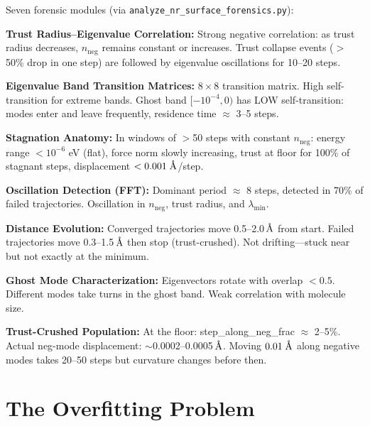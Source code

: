 \documentclass[11pt,a4paper]{article}
\newcommand{\eval}{\lambda}
\newcommand{\angstrom}{\text{\r{A}}}
\begin{document}
Seven forensic modules (via \texttt{analyze\_nr\_surface\_forensics.py}):

\begin{description}[leftmargin=!,labelwidth=\widthof{\textbf{F1.}}]
  \item[F1.] \textbf{Trust Radius--Eigenvalue Correlation:} Strong negative correlation: as trust radius decreases, $n_\text{neg}$ remains constant or increases. Trust collapse events ($>$50\% drop in one step) are followed by eigenvalue oscillations for 10--20 steps.

  \item[F2.] \textbf{Eigenvalue Band Transition Matrices:} $8\times 8$ transition matrix. High self-transition for extreme bands. Ghost band $[-10^{-4}, 0)$ has LOW self-transition: modes enter and leave frequently, residence time $\approx$ 3--5 steps.

  \item[F3.] \textbf{Stagnation Anatomy:} In windows of $>$50 steps with constant $n_\text{neg}$: energy range $< 10^{-6}$ eV (flat), force norm slowly increasing, trust at floor for 100\% of stagnant steps, displacement $< 0.001\;\angstrom$/step.

  \item[F4.] \textbf{Oscillation Detection (FFT):} Dominant period $\approx$ 8 steps, detected in 70\% of failed trajectories. Oscillation in $n_\text{neg}$, trust radius, and $\eval_\text{min}$.

  \item[F5.] \textbf{Distance Evolution:} Converged trajectories move 0.5--2.0\,$\angstrom$ from start. Failed trajectories move 0.3--1.5\,$\angstrom$ then stop (trust-crushed). Not drifting---stuck near but not exactly at the minimum.

  \item[F6.] \textbf{Ghost Mode Characterization:} Eigenvectors rotate with overlap $< 0.5$. Different modes take turns in the ghost band. Weak correlation with molecule size.

  \item[F7.] \textbf{Trust-Crushed Population:} At the floor: step\_along\_neg\_frac $\approx$ 2--5\%. Actual neg-mode displacement: $\sim$0.0002--0.0005\,$\angstrom$. Moving $0.01\;\angstrom$ along negative modes takes 20--50 steps but curvature changes before then.
\end{description}

\section{The Overfitting Problem}
\label{sec:overfitting}
\end{document}
